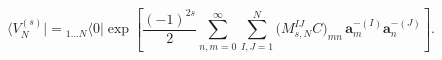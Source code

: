 \begin{equation}
\langle V^{(s)}_N|={}_{1\dots N}\langle 0|\exp\left[
\frac{(-1)^{2s}}{2}\sum_{n,m=0}^{\infty}\sum_{I,J=1}^{N}\bigl(M_{s,N}^{IJ}C
\bigr)_{mn}\,
\mathbf{a}_m^{-(I)}\mathbf{a}_n^{-(J)}\right].
\label{mbra}
\end{equation}

